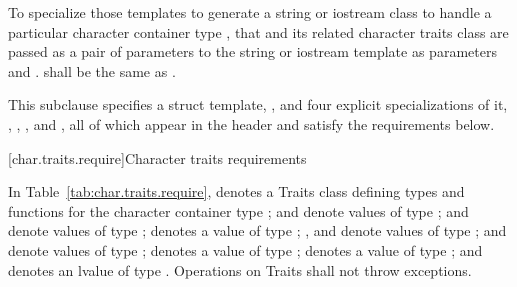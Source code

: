 \pnum
To specialize those templates to generate a string or
iostream class to handle a particular character container type
,
that and its related character traits class
are passed as a pair of parameters to the string or iostream template as
parameters
and
.
shall be the same as
.

\pnum
This subclause specifies a struct template,
,
and four explicit specializations of it,
,
,
,
and
,
all of which appear in the header
and satisfy the requirements below.

[char.traits.require]{Character traits requirements}

\pnum
In Table~\ref{tab:char.traits.require},
denotes a Traits class defining types and functions for the
character container type
;
and
denote values of type
;
and
denote values of type
;
denotes a value of type
;
,
and
denote values of type
;
and
denote values of type
;
denotes a value of type
;
denotes a value of type
;
and
denotes an lvalue of type
.
Operations on Traits shall not throw exceptions.

